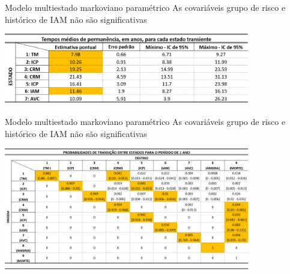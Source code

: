 \begin{frame}

\begin{block}{Modelo multiestado markoviano paramétrico}
\small \pause As covariáveis grupo de risco e histórico de IAM não são
              significativas
\end{block}

\vspace{.5cm}

\pause

\begin{center}
 \includegraphics*[width = 10.75cm]{times_msm_mass.png}
\end{center}

\end{frame}

\begin{frame}

\begin{block}{Modelo multiestado markoviano paramétrico}
\small As covariáveis grupo de risco e histórico de IAM não são 
       significativas
\end{block}

\begin{center}
 \includegraphics*[width = 10.75cm]{probs_mass_msm.png}
\end{center}

\end{frame}

